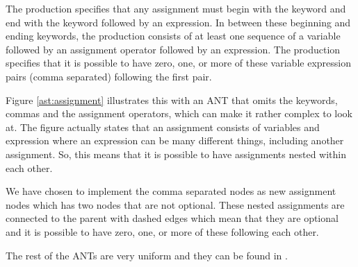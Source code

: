 The production specifies that any assignment must begin with the keyword
 and end with the keyword  followed by an expression. In
between these beginning and ending keywords, the production consists of at least
one sequence of a variable followed by an assignment operator followed by an
expression. The production specifies that it is possible to have zero, one, or
more of these variable expression pairs (comma separated) following the first
pair.



Figure \ref{ast:assignment} illustrates this with an ANT that omits the
keywords, commas and the assignment operators, which can make it rather complex
to look at. The figure actually states that an assignment consists of variables
and expression where an expression can be many different things, including
another assignment. So, this means that it is possible to have assignments
nested within each other. 

We have chosen to implement the comma separated nodes as new assignment nodes
which has two nodes that are not optional. These nested assignments are
connected to the parent with dashed edges which mean that they are optional and
it is possible to have zero, one, or more of these following each other.

The rest of the ANTs are very uniform and they can be found in .
